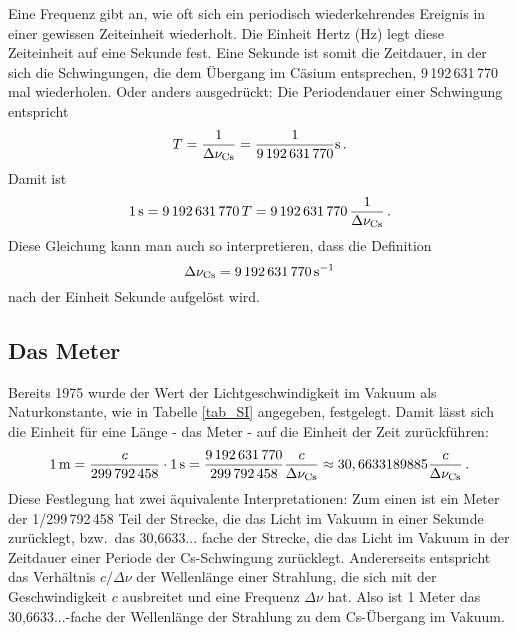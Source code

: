 Eine Frequenz gibt an, 
wie oft sich ein periodisch wiederkehrendes Ereignis in einer gewissen
Zeiteinheit wiederholt. Die Einheit Hertz (Hz) legt diese Zeiteinheit auf eine Sekunde fest. 
Eine Sekunde ist somit die Zeitdauer, in der sich die Schwingungen, die dem \"Ubergang im
C\"asium entsprechen, 9\,192\,631\,770 mal wiederholen. Oder anders ausgedr\"uckt: Die 
Periodendauer einer Schwingung entspricht 
\begin{equation}
               T = \frac{1}{\Delta \nu_{\rm Cs}} = \frac{1}{ 9\,192\,631\,770} {\rm s} \, .
\end{equation}  
Damit ist
\begin{equation}
               1\,{\rm s}  =  9\,192\,631\,770 \, T = 9\,192\,631\,770 \, \frac{1}{\Delta \nu_{\rm Cs}} \, .
\end{equation}  
Diese Gleichung kann man auch so interpretieren, dass die Definition
\begin{equation}
               \Delta \nu_{\rm Cs}  =  9\,192\,631\,770 \, {\rm s}^{-1}
\end{equation}  
nach der Einheit Sekunde aufgel\"ost wird. 

\subsection{Das Meter}

Bereits 1975 wurde der Wert der Lichtgeschwindigkeit 
im Vakuum als Naturkonstante,
wie in Tabelle \ref{tab_SI} angegeben, festgelegt. Damit l\"asst sich die Einheit f\"ur
eine L\"ange - das Meter - auf die Einheit der Zeit zur\"uckf\"uhren:
\begin{equation}
              1\,{\rm m} =                 \frac{c}{299\,792\,458} \cdot 1 \,{\rm s} = 
              \frac{9\,192\,631\,770}{299\,792\,458} \frac{c}{\Delta \nu_{\rm Cs}} 
                 \approx  30,6633189885 \frac{c}{\Delta \nu_{\rm Cs}} \, .
\end{equation}  
Diese Festlegung hat zwei \"aquivalente Interpretationen: Zum einen ist ein Meter der
1/299\,792\,458 Teil der Strecke, die das Licht im Vakuum in einer Sekunde zur\"ucklegt,
bzw.\ das 30,6633... fache der Strecke, die das Licht im Vakuum in der Zeitdauer einer Periode
der Cs-Schwingung zur\"ucklegt. Andererseits entspricht das Verh\"altnis $c/\Delta \nu$
der Wellenl\"ange einer Strahlung, die sich mit der Geschwindigkeit $c$ ausbreitet und eine
Frequenz $\Delta \nu$ hat. Also ist 1 Meter das 30,6633...-fache der 
Wellenl\"ange der Strahlung
zu dem Cs-\"Ubergang im Vakuum. 

